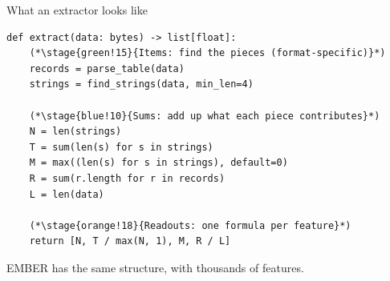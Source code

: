\documentclass[aspectratio=169,11pt]{beamer}
\newcommand{\stage}[2]{\colorbox{#1}{\sffamily\small\bfseries #2}}
\begin{document}
\begin{frame}[fragile]{What an extractor looks like}
\begin{lstlisting}
def extract(data: bytes) -> list[float]:
    (*\stage{green!15}{Items: find the pieces (format-specific)}*)
    records = parse_table(data)
    strings = find_strings(data, min_len=4)

    (*\stage{blue!10}{Sums: add up what each piece contributes}*)
    N = len(strings)
    T = sum(len(s) for s in strings)
    M = max((len(s) for s in strings), default=0)
    R = sum(r.length for r in records)
    L = len(data)

    (*\stage{orange!18}{Readouts: one formula per feature}*)
    return [N, T / max(N, 1), M, R / L]
\end{lstlisting}
  \vfill
  \begin{center}
    EMBER has the same structure, with thousands of features.
  \end{center}
\end{frame}
\end{document}
